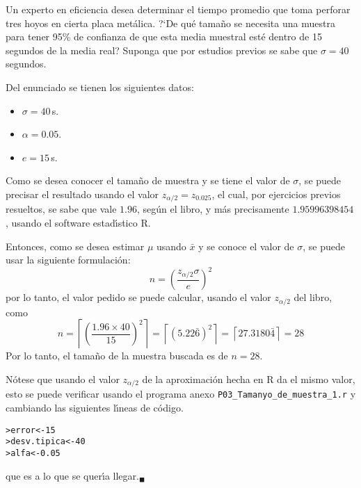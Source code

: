 \begin{enunciado}
 Un experto en eficiencia desea determinar el tiempo promedio que toma perforar tres hoyos en cierta placa met\'alica. ?`De qu\'e tama\~no se necesita una muestra para tener 95\% de confianza de que esta media muestral est\'e dentro de 15 segundos de la media real? Suponga que por estudios previos se sabe que $\sigma=40$ segundos.
\end{enunciado}

\begin{solucion}
 Del enunciado se tienen los siguientes datos:
 \begin{itemize}
  \item $\sigma = 40\,$s.
  \item $\alpha=0.05$.
  \item $e=15\,$s.
 \end{itemize}
 Como se desea conocer el tama\~no de muestra y se tiene el valor de $\sigma$, se puede precisar el resultado usando el valor $z_{\alpha/2} = z_{0.025}$, el cual, por ejercicios previos resueltos, se sabe que vale $1.96$, seg\'un el libro, y m\'as precisamente $1.95996398454$, usando el software estad\'{\i}stico R.
 \par 
 Entonces, como se desea estimar $\mu$ usando $\bar{x}$ y se conoce el valor de $\sigma$, se puede usar la siguiente formulaci\'on:
 \begin{equation*}
  n = \left( \frac{z_{\alpha/2}\sigma}{e} \right)^2
 \end{equation*}
 por lo tanto, el valor pedido se puede calcular, usando el valor $z_{\alpha/2}$ del libro, como
 \begin{equation*}
  n = \left\lceil \left( \frac{1.96\times 40}{15} \right)^2  \right\rceil = \left\lceil \left( 5.22\bar{6} \right)^2 \right\rceil = \left\lceil 27.3180\bar{4} \right\rceil = 28
 \end{equation*}
 Por lo tanto, el tama\~no de la muestra buscada es de $n=28$.
 \par 
 N\'otese que usando el valor $z_{\alpha/2}$ de la aproximaci\'on hecha en R da el mismo valor, esto se puede verificar usando el programa anexo \texttt{P03\_Tamanyo\_de\_muestra\_1.r} y cambiando las siguientes l\'{\i}neas de c\'odigo.
 \begin{verbatim}
>error<-15
>desv.tipica<-40
>alfa<-0.05
 \end{verbatim}
 \vspace{-0.5cm}
 que es a lo que se quer\'{\i}a llegar.${}_{\blacksquare}$
\end{solucion}

